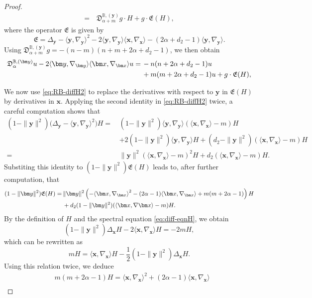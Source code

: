 \documentclass{amsart}
\theoremstyle{remark}
\def\la{{\langle}}
\def\ra{{\rangle}}
\def\fD{{\mathfrak D}}
\def\fE{{\mathfrak E}}
\def\a{{\alpha}}
\def\la{{\langle}}
\def\ra{{\rangle}}
\def\xb{{\bm x}}
\def\yb{{\bm y}}
\def\BB{{\mathbb B}}
\begin{document}
\begin{proof}
\begin{align*}
    = \, & \fD_{\a+ m}^{\BB, (\yb)}g\cdot H  + g \cdot \fE(H) ,
\end{align*}
where the operator $\fE$ is given by 
$$
  \fE = \Delta_\yb - \la \yb,\nabla_{\yb} \ra^2 -2 \la \yb,\nabla_{\yb} \ra \la \xb,\nabla_{\xb} \ra
  - (2\a + d_2 -1)  \la \yb,\nabla_{\yb} \ra.  
$$
Using $\fD_{\a+ m}^{\BB, (\yb)}g = - (n-m) (n+m + 2\a + d_2 -1)$, %
we then obtain
\begin{align}\label{eq:Dmu_RB}
\fD_\a^{\BB, (\yb)} u -2 \la \yb,\nabla_{\yb} \ra \la \xb,\nabla_{\xb} \ra u 
     =\,&   -n(n+2\a+d_2 -1) u  \\
     &  + m (m+2\a+d_2 -1) u + g \cdot \fE(H), \notag
\end{align}

We now use \eqref{eq:RB-diffH2} to replace the derivatives with respect to $\yb$ in $\fE(H)$ by derivatives in
$\xb$. Applying the second identity in \eqref{eq:RB-diffH2} twice, a careful computation shows that 
\begin{align*}
 (1-\|\yb\|^2) \big(\Delta_\yb -   \la \yb,\nabla_{\yb} \ra^2\big)H =\, &
       (1-\|\yb\|^2) \la \yb,\nabla_{\yb} \ra ( \la \xb,\nabla_{\xb} \ra - m )H\\
  &   + 2 (1-\|\yb\|^2)  \la \yb,\nabla_{\yb} \ra H 
     + (d_2 - \|\yb\|^2) ( \la \xb,\nabla_{\xb} \ra -m )H \\
   = &\|\yb\|^2 
       ( \la \xb,\nabla_{\xb} \ra -m )^2 H 
     +  d_2 ( \la \xb,\nabla_{\xb} \ra -m )H.
\end{align*}
Substiting this identity to $(1-\|\yb\|^2) \fE(H)$ leads to, after further computation, that 
\begin{align} \label{eq:EH-R}
 (1-\|\yb\|^2) \fE(H) = \, & \|\yb\|^2 \left(-\la \xb,\nabla_{\xb} \ra^2 - (2\a -1) \la \xb,\nabla_{\xb} \ra+ m(m+2 \a -1) \right)H \\
     & + d_2 (1-\|\yb\|^2) (\la \xb, \nabla \xb\ra -m)H. \notag
\end{align}
By the definition of $H$ and the spectral equation \eqref{eq:diff-eqnH}, we obtain
\begin{equation} \label{eq:diffH-RB}
    (1-\|\yb\|^2) \Delta_\xb H - 2 \la \xb, \nabla_\xb \ra H = - 2 m H,
\end{equation}
which can be rewritten as 
$$
   m H = \la \xb, \nabla_\xb \ra H - \frac12 (1-\|\yb\|^2) \Delta_{\xb} H.
$$
Using this relation twice, we deduce 
\begin{align} \label{eq:mm-H}
   & m(m+ 2 \a -1) H  = \la \xb, \nabla_\xb \ra^2 + (2\a-1)  \la \xb, \nabla_\xb \ra \\

\end{align}
\end{proof}
\end{document}
